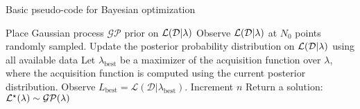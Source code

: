 \begin{algorithm}
\caption{Basic pseudo-code for Bayesian optimization}
\label{alg:BayesOpt}
\begin{algorithmic}[1] %
    \State Place Gaussian process $\mathcal{GP}$ prior on $\mathcal{L}(\mathcal{D}|\lambda)$
    \State Observe $\mathcal{L}(\mathcal{D}|\lambda)$ at $N_0$ points randomly sampled.
        \State Update the posterior probability distribution on $\mathcal{L}(\mathcal{D}|\lambda)$ using all available data
        \State Let $\lambda_{\textrm{best}}$ be a maximizer of the acquisition function over $\lambda$, where the acquisition function is computed using the current posterior distribution.
        \State Observe $L_{\textrm{best}} = \mathcal{L}(\mathcal{D}|\lambda_{\textrm{best}})$.
        \State Increment $n$
    \EndWhile
    \State Return a solution: $\mathcal{L}^{\star}(\lambda) \sim \mathcal{GP}(\lambda)$
\end{algorithmic}
\end{algorithm}

